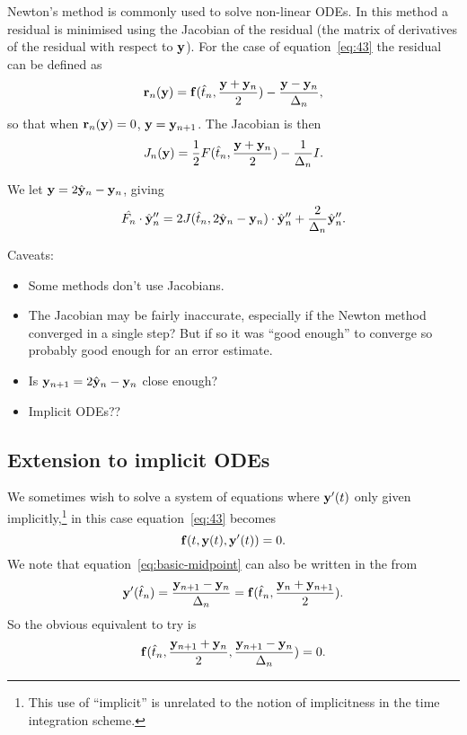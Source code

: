 Newton's method is commonly used to solve non-linear ODEs.\cite{??ds}
In this method a residual is minimised using the Jacobian of the residual (the matrix of derivatives of the residual with respect to $\mathbf{y}$).
For the case of equation~\eqref{eq:43} the residual can be defined as\cite{??ds}
\begin{equation}
  \mathbf{r}_n(\mathbf{y}) = {\mathbf{f}}(\hat{t}_{n}, \frac{\mathbf{y} + \mathbf{y}_n}{2}) - \frac{\mathbf{y} - \mathbf{y}_{n}}{\Delta_{n}},
\end{equation}
so that when $\mathbf{r}_n(\mathbf{y}) =0$, $\mathbf{y} = \mathbf{y}_{n+1}$.
The Jacobian is then
\begin{equation}
  J_n(\mathbf{y}) = \frac{1}{2}F(\hat{t}_{n}, \frac{\mathbf{y} + \mathbf{y}_n}{2}) - \frac{1}{\Delta_{n}}I.
\end{equation}

We let $\mathbf{y} = 2 \hat{\mathbf{y}}_{n} - \mathbf{y}_n$, giving
\begin{equation}
  \hat{F_{n}} \cdot \hat{\mathbf{y}}_{n}'' = 2 J(\hat{t}_{n}, 2 \hat{\mathbf{y}}_{n} - \mathbf{y}_n) \cdot \hat{\mathbf{y}}_{n}'' + \frac{2}{\Delta_{n}} \hat{\mathbf{y}}_{n}''.
\end{equation}

Caveats:
\begin{itemize}
\item Some methods don't use Jacobians.
\item The Jacobian may be fairly inaccurate, especially if the Newton method converged in a single step? But if so it was ``good enough'' to converge so probably good enough for an error estimate.
\item Is $\mathbf{y}_{n+1} = 2 \hat{\mathbf{y}}_{n} - \mathbf{y}_n$ close enough?
\item Implicit ODEs??
\end{itemize}


\subsection{Extension to implicit ODEs}

We sometimes wish to solve a system of equations where $\mathbf{y}'(t)$ only given implicitly,\footnote{This use of ``implicit'' is unrelated to the notion of implicitness in the time integration scheme.} in this case equation~\eqref{eq:43} becomes
\begin{equation}
  {\mathbf{f}}(t, \mathbf{y}(t), \mathbf{y}'(t)) = 0.
\end{equation}
We note that equation~\eqref{eq:basic-midpoint} can also be written in the from
\begin{equation}
  \mathbf{y}'(\hat{t}_{n}) = \frac{\mathbf{y}_{n+1} - \mathbf{y}_n}{\Delta_{n}} =  {\mathbf{f}}(\hat{t}_{n}, \frac{\mathbf{y}_n + \mathbf{y}_{n+1}}{2}).
\end{equation}
So the obvious equivalent to try is
\begin{equation}
  {\mathbf{f}}(\hat{t}_{n}, \frac{\mathbf{y}_{n+1} + \mathbf{y}_n}{2}, \frac{\mathbf{y}_{n+1} - \mathbf{y}_n}{\Delta_{n}}) = 0.
\end{equation}


